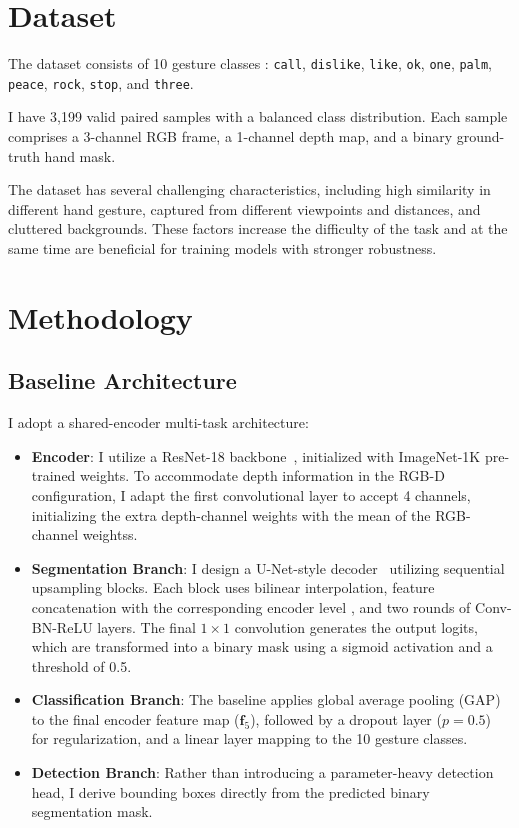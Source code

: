 \documentclass[conference]{IEEEtran}
\begin{document}
\section{Dataset}
The dataset consists of 10 gesture classes : \texttt{call}, \texttt{dislike}, \texttt{like}, \texttt{ok}, \texttt{one}, \texttt{palm}, \texttt{peace}, \texttt{rock}, \texttt{stop}, and \texttt{three}.

I have 3,199 valid paired samples with a balanced class distribution. Each sample comprises a 3-channel RGB frame, a 1-channel depth map, and a binary ground-truth hand mask.

The dataset has several challenging characteristics, including high similarity in different hand gesture, captured from different viewpoints and distances, and cluttered backgrounds. These factors increase the difficulty of the task and at the same time are beneficial for training models with stronger robustness.

\section{Methodology}
\subsection{Baseline Architecture}
I adopt a shared-encoder multi-task architecture:
\begin{itemize}
    \item \textbf{Encoder}: I utilize a ResNet-18 backbone~\cite{he2016resnet}, initialized with ImageNet-1K pre-trained weights. To accommodate depth information in the RGB-D configuration, I adapt the first convolutional layer to accept 4 channels, initializing the extra depth-channel weights with the mean of the RGB-channel weightss.
    \item \textbf{Segmentation Branch}: I design a U-Net-style decoder~\cite{ronneberger2015unet} utilizing sequential upsampling blocks. Each block uses bilinear interpolation, feature concatenation with the corresponding encoder level , and two rounds of Conv-BN-ReLU layers. The final $1 \times 1$ convolution generates the output logits, which are transformed into a binary mask using a sigmoid activation and a threshold of 0.5.
    \item \textbf{Classification Branch}: The baseline applies global average pooling (GAP) to the final encoder feature map ($\mathbf{f}_5$), followed by a dropout layer ($p=0.5$) for regularization, and a linear layer mapping to the 10 gesture classes.
    \item \textbf{Detection Branch}: Rather than introducing a parameter-heavy detection head, I derive bounding boxes directly from the predicted binary segmentation mask. 
\end{itemize}
\end{document}
